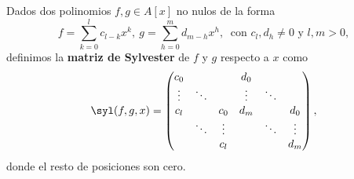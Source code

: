 \begin{definicion}
    Dados dos polinomios $f,g \in A[x]$ no nulos de la forma
    $$f = \sum_{k=0}^l c_{l-k} x^k,\ g = \sum_{h=0}^m d_{m-h} x^h,\ \text{ con } c_l, d_h\neq 0 \text{ y } l,m>0,$$
    definimos la \textbf{matriz de Sylvester} de $f$ y $g$ respecto a $x$ como
    \begin{equation*}
        \syl(f,g,x) = \begin{pmatrix}
            c_0     &           &           & d_0\\
            \vdots  & \ddots    &           & \vdots &\ddots  &\\
            c_l     &           & c_0       & d_m    &       & d_0\\
                    & \ddots    & \vdots    &        & \ddots      &\vdots\\
                    &           & c_l       &        &              &d_m   
        \end{pmatrix},
    \end{equation*}
    donde el resto de posiciones son cero.
\end{definicion}

